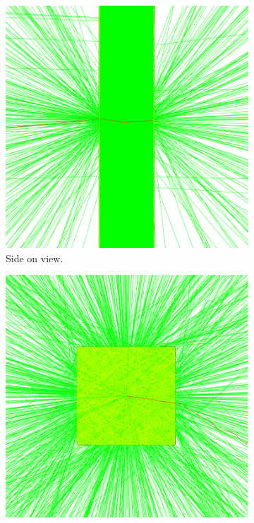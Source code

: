 \begin{figure}[!h]
\centering
\begin{subfigure}{.5\textwidth}
  \centering
  \includegraphics[width=0.9\linewidth]{Chapter4/Figs/Raster/lengthOnViewSliceElectron780Square.png}
  \captionsetup{width=.9\linewidth}
  \caption{Side on view.}
  \label{subFig:lengthOnViewSliceElectron780Square}
\end{subfigure}%
\begin{subfigure}{.5\textwidth}
  \centering
  \includegraphics[width=0.9\linewidth]{Chapter4/Figs/Raster/sideOnViewSliceElectron780Square.png}

\end{subfigure}
\end{figure}
